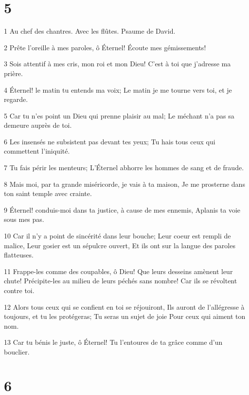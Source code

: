 \chapter{5}

\par 1 Au chef des chantres. Avec les flûtes. Psaume de David.
\par 2 Prête l'oreille à mes paroles, ô Éternel! Écoute mes gémissements!
\par 3 Sois attentif à mes cris, mon roi et mon Dieu! C'est à toi que j'adresse ma prière.
\par 4 Éternel! le matin tu entends ma voix; Le matin je me tourne vers toi, et je regarde.
\par 5 Car tu n'es point un Dieu qui prenne plaisir au mal; Le méchant n'a pas sa demeure auprès de toi.
\par 6 Les insensés ne subsistent pas devant tes yeux; Tu hais tous ceux qui commettent l'iniquité.
\par 7 Tu fais périr les menteurs; L'Éternel abhorre les hommes de sang et de fraude.
\par 8 Mais moi, par ta grande miséricorde, je vais à ta maison, Je me prosterne dans ton saint temple avec crainte.
\par 9 Éternel! conduis-moi dans ta justice, à cause de mes ennemis, Aplanis ta voie sous mes pas.
\par 10 Car il n'y a point de sincérité dans leur bouche; Leur coeur est rempli de malice, Leur gosier est un sépulcre ouvert, Et ils ont sur la langue des paroles flatteuses.
\par 11 Frappe-les comme des coupables, ô Dieu! Que leurs desseins amènent leur chute! Précipite-les au milieu de leurs péchés sans nombre! Car ils se révoltent contre toi.
\par 12 Alors tous ceux qui se confient en toi se réjouiront, Ils auront de l'allégresse à toujours, et tu les protégeras; Tu seras un sujet de joie Pour ceux qui aiment ton nom.
\par 13 Car tu bénis le juste, ô Éternel! Tu l'entoures de ta grâce comme d'un bouclier.

\chapter{6}

